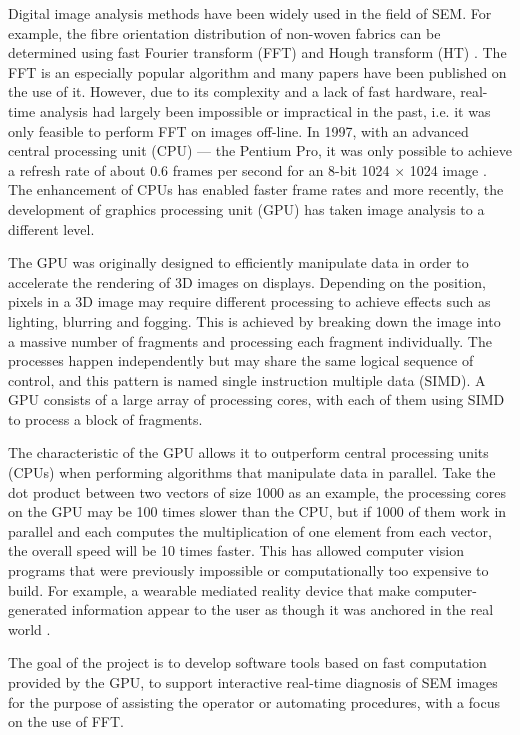 \documentclass[12pt, conference]{IEEEtran}
\begin{document}
Digital image analysis methods have been widely used in the field of SEM. For example, the fibre orientation distribution of non-woven fabrics can be determined using fast Fourier transform (FFT) and Hough transform (HT) \cite{SEM for microstructural analysis}. The FFT is an especially popular algorithm and many papers have been published on the use of it. However, due to its complexity and a lack of fast hardware, real-time analysis had largely been impossible or impractical in the past, i.e. it was only feasible to perform FFT on images off-line. In 1997, with an advanced central processing unit (CPU) --- the Pentium Pro, it was only possible to achieve a refresh rate of about 0.6 frames per second for an 8-bit 1024 $\times$ 1024 image \cite{SEM image sharpness measurement}. The enhancement of CPUs has enabled faster frame rates and more recently, the development of graphics processing unit (GPU) has taken image analysis to a different level.

The GPU was originally designed to efficiently manipulate data in order to accelerate the rendering of 3D images on displays. Depending on the position, pixels in a 3D image may require different processing to achieve effects such as lighting, blurring and fogging. This is achieved by breaking down the image into a massive number of fragments and processing each fragment individually. The processes happen independently but may share the same logical sequence of control, and this pattern is named single instruction multiple data (SIMD). A GPU consists of a large array of processing cores, with each of them using SIMD to process a block of fragments.

The characteristic of the GPU allows it to outperform central processing units (CPUs) when performing algorithms that manipulate data in parallel. Take the dot product between two vectors of size 1000 as an example, the processing cores on the GPU may be 100 times slower than the CPU, but if 1000 of them work in parallel and each computes the multiplication of one element from each vector, the overall speed will be 10 times faster. This has allowed computer vision programs that were previously impossible or computationally too expensive to build. For example, a wearable mediated reality device that make computer-generated information appear to the user as though it was anchored in the real world \cite{GPU mediated reality}.

The goal of the project is to develop software tools based on fast computation provided by the GPU, to support interactive real-time diagnosis of SEM images for the purpose of assisting the operator or automating procedures, with a focus on the use of FFT.
\end{document}
